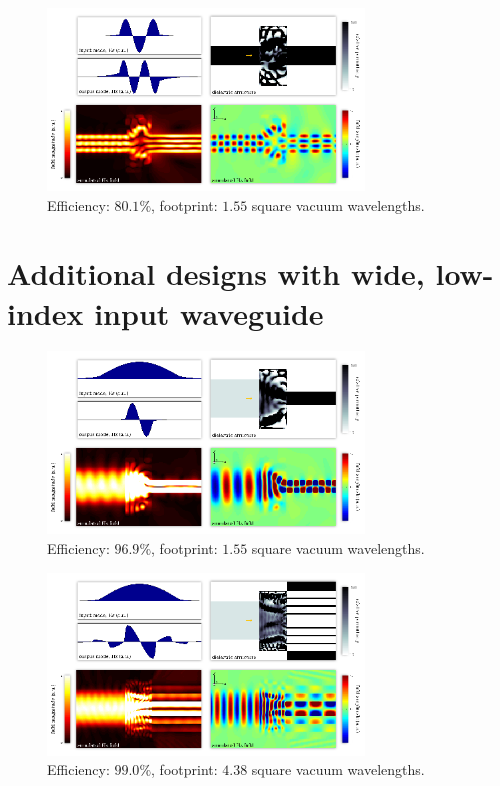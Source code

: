 \documentclass[letterpaper,10pt]{article}
\begin{document}
\begin{appendix}
\begin{figure}[htb]
    \centering
    \includegraphics[width=0.75\textwidth]{11}
    \caption{
        Efficiency: $80.1\%$,
        footprint: $1.55$ square vacuum wavelengths.
        }
\end{figure}
\clearpage
\section{Additional designs with wide, low-index input waveguide}
\begin{figure}[htb]
    \centering
    \includegraphics[width=0.75\textwidth]{12}
    \caption{
        Efficiency: $96.9\%$,
        footprint: $1.55$ square vacuum wavelengths.
        }
\end{figure}


\begin{figure}[htb]
    \centering
    \includegraphics[width=0.75\textwidth]{13}
    \caption{
        Efficiency: $99.0\%$,
        footprint: $4.38$ square vacuum wavelengths.
        }
\end{figure}



\end{appendix}
\end{document}
